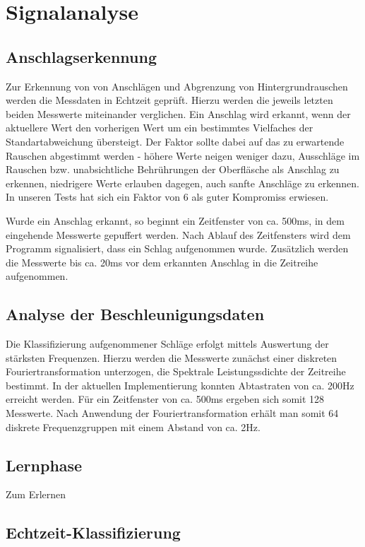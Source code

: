 \section*{Signalanalyse}
\subsection*{Anschlagserkennung}
Zur Erkennung von von Anschlägen und Abgrenzung von Hintergrundrauschen werden die Messdaten in Echtzeit geprüft. Hierzu werden die jeweils letzten beiden Messwerte miteinander verglichen. Ein Anschlag wird erkannt, wenn der aktuellere Wert den vorherigen Wert um ein bestimmtes Vielfaches der Standartabweichung übersteigt. Der Faktor sollte dabei auf das zu erwartende Rauschen abgestimmt werden - höhere Werte neigen weniger dazu, Ausschläge im Rauschen bzw. unabsichtliche Behrührungen der Oberfläsche als Anschlag zu erkennen, niedrigere Werte erlauben dagegen, auch sanfte Anschläge zu erkennen. In unseren Tests hat sich ein Faktor von 6 als guter Kompromiss erwiesen.

Wurde ein Anschlag erkannt, so beginnt ein Zeitfenster von ca. 500ms, in dem eingehende Messwerte gepuffert werden. Nach Ablauf des Zeitfensters wird dem Programm signalisiert, dass ein Schlag aufgenommen wurde. Zusätzlich werden die Messwerte bis ca. 20ms vor dem erkannten Anschlag in die Zeitreihe aufgenommen.

\subsection*{Analyse der Beschleunigungsdaten}
Die Klassifizierung aufgenommener Schläge erfolgt mittels Auswertung der stärksten Frequenzen. Hierzu werden die Messwerte zunächst einer diskreten Fouriertransformation unterzogen, die Spektrale Leistungssdichte der Zeitreihe bestimmt.
In der aktuellen Implementierung konnten Abtastraten von ca. 200Hz erreicht werden. Für ein Zeitfenster von ca. 500ms ergeben sich somit 128 Messwerte. Nach Anwendung der Fouriertransformation erhält man somit 64 diskrete Frequenzgruppen mit einem Abstand von ca. 2Hz.

\subsection*{Lernphase}
Zum Erlernen

\subsection*{Echtzeit-Klassifizierung}




